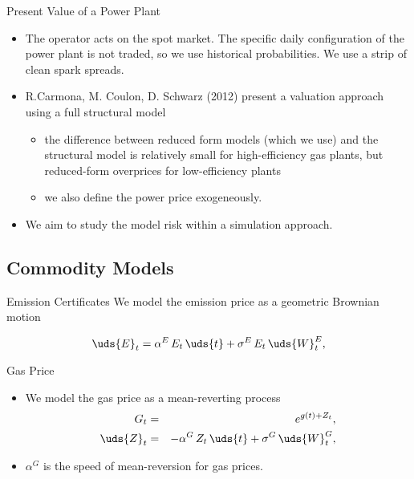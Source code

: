 {Present Value of a Power Plant}
\begin{itemize}
\item<1-> The operator acts on the spot market. The specific daily configuration of the power plant is not traded, so we use historical probabilities. We use a strip of clean spark spreads.
\item<2-> R.Carmona, M. Coulon, D. Schwarz (2012)
present a valuation approach using a full structural model
\begin{itemize}
\item the difference between reduced form models (which we use) and the structural model is relatively small for high-efficiency gas plants, but reduced-form overprices for low-efficiency plants
\item we also define the power price exogeneously.
\end{itemize}
\item<3-> We aim to study the model risk within a simulation approach.
\end{itemize}





\subsection{Commodity Models}


{ Emission Certificates}
We model the emission price as a geometric Brownian motion

\begin{equation}
\uds{E}_t = \alpha^E\,E_t\,\uds{t} + \sigma^E\,E_t\,\uds{W}^E_t,
\label{co2}
\end{equation}


{Gas Price}
\begin{itemize}
\item We model the gas price as a mean-reverting process
\begin{eqnarray}
G_t & = & e^{g(t) + Z_t},  \nonumber \\
\uds{Z}_t & = & -\alpha^G\,Z_t\,\uds{t} + \sigma^G\,\uds{W}^G_t,
\label{gas}
\end{eqnarray}
\item $\alpha^G$ is the speed of mean-reversion for gas prices.
\end{itemize}


